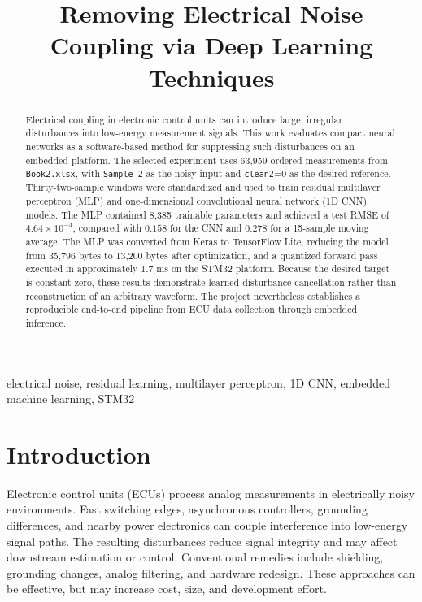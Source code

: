 \documentclass[conference]{IEEEtran}
\begin{document}
\title{Removing Electrical Noise Coupling via Deep Learning Techniques}

\author{
}

\maketitle

\begin{abstract}
Electrical coupling in electronic control units can introduce large, irregular disturbances into low-energy measurement signals. This work evaluates compact neural networks as a software-based method for suppressing such disturbances on an embedded platform. The selected experiment uses 63,959 ordered measurements from \texttt{Book2.xlsx}, with \texttt{Sample 2} as the noisy input and \texttt{clean2}=0 as the desired reference. Thirty-two-sample windows were standardized and used to train residual multilayer perceptron (MLP) and one-dimensional convolutional neural network (1D CNN) models. The MLP contained 8,385 trainable parameters and achieved a test RMSE of $4.64\times10^{-4}$, compared with $0.158$ for the CNN and $0.278$ for a 15-sample moving average. The MLP was converted from Keras to TensorFlow Lite, reducing the model from 35,796 bytes to 13,200 bytes after optimization, and a quantized forward pass executed in approximately 1.7 ms on the STM32 platform. Because the desired target is constant zero, these results demonstrate learned disturbance cancellation rather than reconstruction of an arbitrary waveform. The project nevertheless establishes a reproducible end-to-end pipeline from ECU data collection through embedded inference.
\end{abstract}

\begin{IEEEkeywords}
electrical noise, residual learning, multilayer perceptron, 1D CNN, embedded machine learning, STM32
\end{IEEEkeywords}

\section{Introduction}
Electronic control units (ECUs) process analog measurements in electrically noisy environments. Fast switching edges, asynchronous controllers, grounding differences, and nearby power electronics can couple interference into low-energy signal paths. The resulting disturbances reduce signal integrity and may affect downstream estimation or control. Conventional remedies include shielding, grounding changes, analog filtering, and hardware redesign. These approaches can be effective, but may increase cost, size, and development effort.
\end{document}
